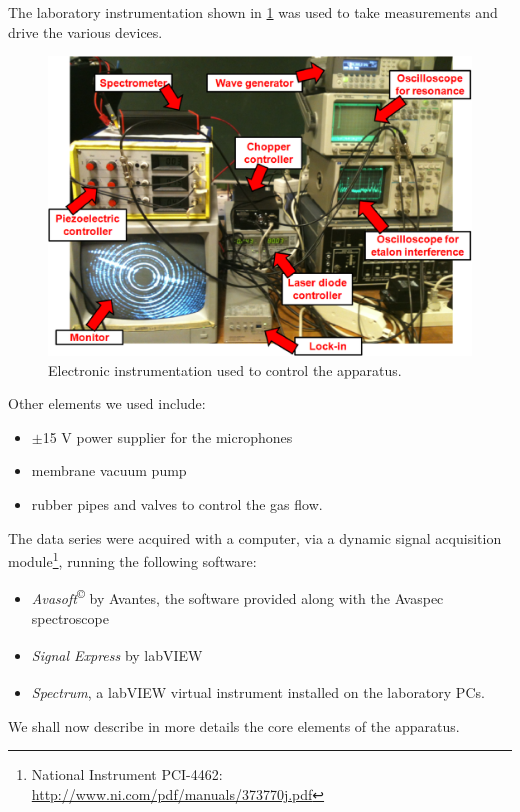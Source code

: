 The laboratory instrumentation shown in \cref{instrument} was used to take measurements and drive the various devices.
\begin{figure}[t]\centering
\includegraphics[width=\linewidth, draft=\foto]{eps/instrument.eps}
\caption{Electronic instrumentation used to control the apparatus.}
\label{instrument}
\end{figure}
Other elements we used include:
\begin{itemize}
\item $\pm$15 V power supplier for the microphones
\item membrane vacuum pump
\item rubber pipes and valves to control the gas flow.
\end{itemize}
The data series were acquired with a computer, via a dynamic signal acquisition module\footnote{National Instrument PCI-4462: \url{http://www.ni.com/pdf/manuals/373770j.pdf}}, running the following software:
\begin{itemize}
\item \textit{Avasoft}\textsuperscript{\copyright} by Avantes, the software provided along with the Avaspec spectroscope
\item \textit{Signal Express}\textsuperscript{\texttrademark} by labVIEW\textsuperscript{\texttrademark}
\item \textit{Spectrum}, a labVIEW\textsuperscript{\texttrademark} virtual instrument installed on the laboratory PCs.
\end{itemize}
 We shall now describe in more details the core elements of the apparatus.
